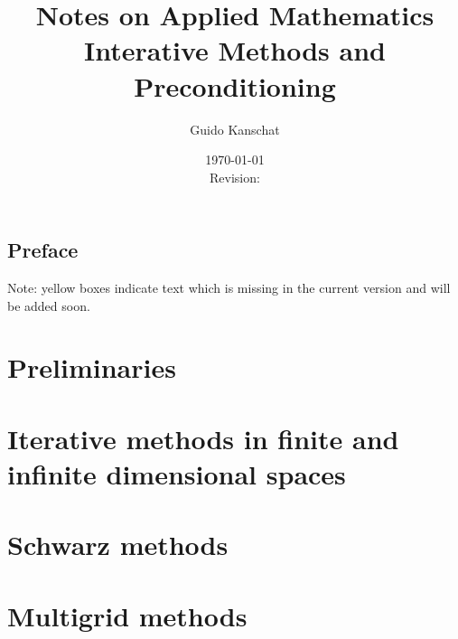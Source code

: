 \documentclass[USenglish,final]{report}
\title{\textbf{Notes on Applied Mathematics}
\\[5mm]
{\large Interative Methods and Preconditioning}}
\author{Guido Kanschat}
\date{\today\\[5mm]Revision: \svnrev}
\begin{document}
\maketitle

\section*{Preface}


\begin{todo}
  Note: yellow boxes indicate text which is missing in the current
  version and will be added soon.
\end{todo}

\tableofcontents

\chapter{Preliminaries}


\chapter{Iterative methods in finite and infinite dimensional spaces}




\chapter{Schwarz methods}
\label{cha:iteration:schwarz-methods}


\chapter{Multigrid methods}
\label{cha:iteration:multigrid-methods}


\printbibliography
\printindex
\end{document}
